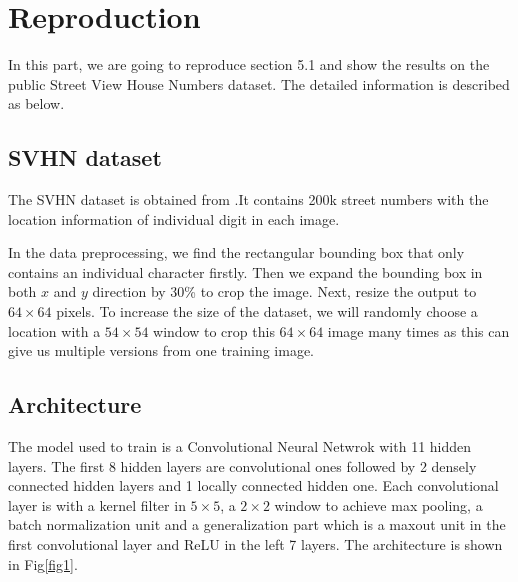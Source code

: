 \documentclass[conference]{IEEEtran}
\begin{document}








\section{Reproduction}
In this part, we are going to reproduce section 5.1\cite{street} and show the results on the public Street View House Numbers dataset. The detailed information is described as below.
\subsection{SVHN dataset}
The SVHN dataset is obtained from \cite{image}.It contains 200k street numbers with the location information of individual digit in each image. 

In the data preprocessing, we find the rectangular bounding box that only contains an individual character firstly. Then we expand the bounding box in both $x$ and $y$ direction by 30\% to crop the image. Next, resize the output to $64\times64$ pixels. To increase the size of the dataset, we will randomly choose a location with a $54\times54$ window to crop this $64\times64$ image many times as this can give us multiple versions from one training image. 
\subsection{Architecture}
The model used to train is a Convolutional Neural Netwrok with 11 hidden layers. The first 8 hidden layers are convolutional ones followed by 2 densely connected hidden layers and 1 locally connected hidden one. Each convolutional layer is with a kernel filter in $5\times5$, a $2\times2$ window to achieve max pooling, a batch normalization unit and a generalization part which is a maxout unit in the first convolutional layer and ReLU in the left 7 layers. The architecture is shown in Fig\ref{fig1}.
\end{document}
